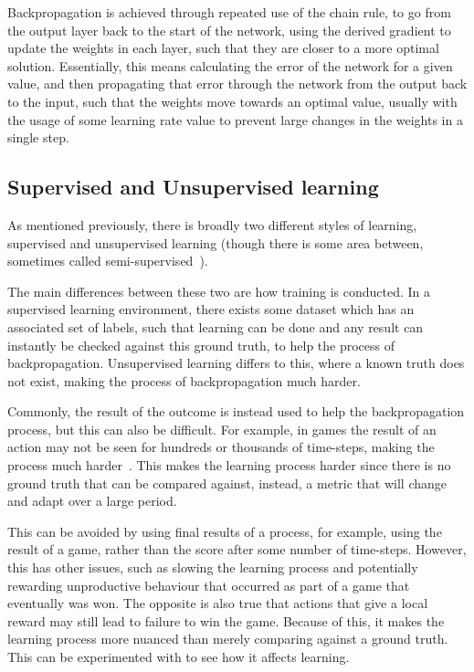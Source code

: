 Backpropagation is achieved through repeated use of the chain rule, to go from
the output layer back to the start of the network, using the derived gradient to
update the weights in each layer, such that they are closer to a more optimal
solution. Essentially, this means calculating the error of the network for a
given value, and then propagating that error through the network from the output
back to the input, such that the weights move towards an optimal value, usually
with the usage of some learning rate value to prevent large changes in the
weights in a single step.

\subsection{Supervised and Unsupervised learning}

As mentioned previously, there is broadly two different styles of learning,
supervised and unsupervised learning (though there is some area between,
sometimes called semi-supervised~\cite{chapelle2009semi}).

The main differences between these two are how training is conducted. In a
supervised learning environment, there exists some dataset which has an
associated set of labels, such that learning can be done and any result can
instantly be checked against this ground truth, to help the process of
backpropagation. Unsupervised learning differs to this, where a known truth does
not exist, making the process of backpropagation much harder.

Commonly, the result of the outcome is instead used to help the
backpropagation process, but this can also be difficult. For example, in games
the result of an action may not be seen for hundreds or thousands of time-steps,
making the process much harder~\cite{sutton1984temporal}. This makes the
learning process harder since there is no ground truth that can be compared
against, instead, a metric that will change and adapt over a large period.

This can be avoided by using final results of a process, for example, using the
result of a game, rather than the score after some number of time-steps.
However, this has other issues, such as slowing the learning process and
potentially rewarding unproductive behaviour that occurred as part of a game
that eventually was won. The opposite is also true that actions that give a
local reward may still lead to failure to win the game. Because of this, it
makes the learning process more nuanced than merely comparing against a ground
truth. This can be experimented with to see how it affects learning.

